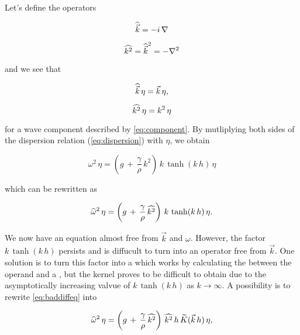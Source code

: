 Let's define the operators

\begin{samepage}
\begin{equation} \label{eq:opkvec}
\widehat{\vec{k}} = -i\,\nabla
\end{equation}

\begin{equation} \label{eq:opk2}
\widehat{k^2} = \widehat{\vec{k}}^2 = -\nabla^2
\end{equation}
\end{samepage}

and we see that 

\begin{samepage}
\begin{equation} \label{eq:opkvec1action}
\vop{k}\,\eta = \vec{k}\,\eta,%
\end{equation}

\begin{equation} \label{eq:opk2action}
\widehat{k^2}\,\eta = k^2\,\eta
\end{equation}
\end{samepage}

for a wave component described by \eqref{eq:component}. By mutliplying both sides of the dispersion relation (\eqref{eq:dispersion}) with $\eta$, we obtain

\begin{equation}
\omega^2\,\eta = \left(g\,+\,\frac{\gamma}{\rho}\,k^2\right)\,k\,\tanh(k\,h)\,\eta
\end{equation}

which can be rewritten as

\begin{equation} \label{eq:baddiffeq}
\widehat{\omega}^2\,\eta = \left(g\,+\,\frac{\gamma}{\rho}\,\widehat{k^2}\right)\,k\,\tanh(k\,h)\,\eta.
\end{equation}

We now have an equation almost free from $\vec{k}$ and $\omega$. However, the factor $k\,\tanh(k\,h)$ persists and is diffucult to turn into an operator free from $\vec{k}$. One solution is to turn this factor into a  which works by calculating the  between the operand and a , but the kernel proves to be difficult to obtain due to the asymptotically increasing valvue of $k\,\tanh(k\,h)$ as $k\rightarrow\infty$. A possibility is to rewrite \eqref{eq:baddiffeq} into

\begin{equation} \label{eq:betterdiffeq}
\widehat{\omega}^2\,\eta = \left(g\,+\,\frac{\gamma}{\rho}\,\widehat{k^2}\right)\,\widehat{k^2}\,h\,\widetilde{K}(\vec{k}\,h)\,\eta,
\end{equation}

